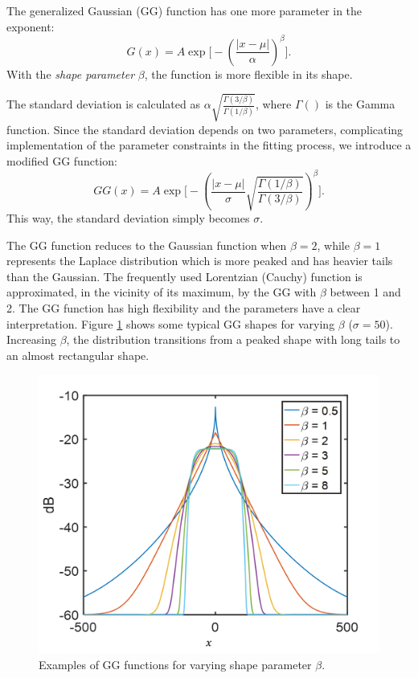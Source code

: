 The generalized Gaussian (GG) function has one more parameter in the exponent:%
\begin{equation}
G(x) = A\exp\biggl[-\left(\frac{|x-\mu|}{\alpha}\right)^{\beta}\biggr].
\end{equation}
\noindent With the \emph{shape parameter} $\beta$, the function is more flexible in its shape.

The standard deviation is calculated as $\alpha\sqrt{\frac{\Gamma(3/\beta)}{\Gamma(1/\beta)}}$, where $\Gamma()$ is the Gamma function. Since the standard deviation depends on two parameters, complicating implementation of the parameter constraints in the fitting process, we introduce a modified GG function:%
\begin{equation}
GG(x) = A\exp\biggl[-\left( \frac{|x-\mu|}{\sigma} \sqrt{\frac{\Gamma(1/\beta)}{\Gamma(3/\beta)}} \right)^{\beta}\biggr].
\end{equation}
\noindent This way, the standard deviation simply becomes $\sigma$.

The GG function reduces to the Gaussian function when $\beta = 2$, while $\beta = 1$ represents the Laplace distribution which is more peaked and has heavier tails than the Gaussian. The frequently used Lorentzian (Cauchy) function is approximated, in the vicinity of its maximum, by the GG with $\beta$ between 1 and 2. The GG function has high flexibility and the parameters have a clear interpretation. Figure \ref{fig:GGD_plot} shows some typical GG shapes for varying $\beta$ ($\sigma = 50$). Increasing $\beta$, the distribution transitions from a peaked shape with long tails to an almost rectangular shape.


\begin{figure}[h]
\begin{centering}
\includegraphics[scale=0.35]{fig_GGD_plot.png}
\par\end{centering}
\caption{Examples of GG functions for varying shape parameter $\beta$.}
\label{fig:GGD_plot}
\end{figure}


